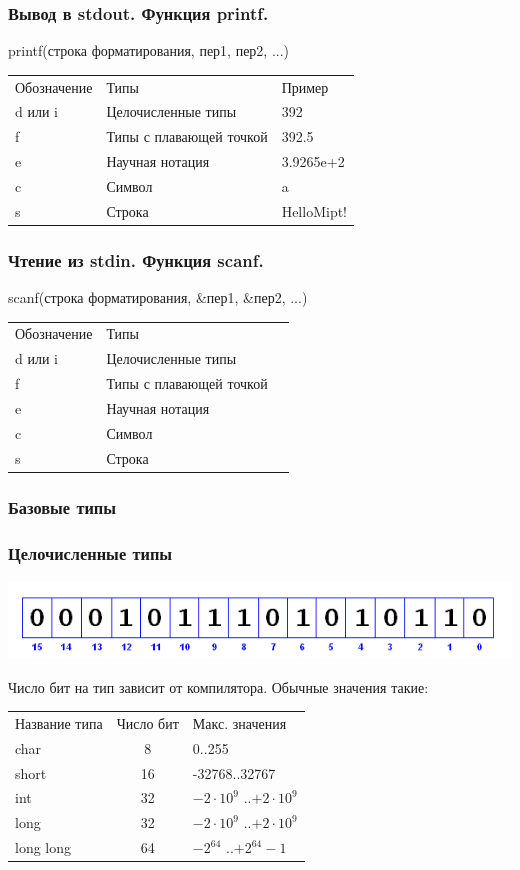 \documentclass[14pt,pdf,hyperref={unicode}]{beamer}
\begin{document}
\begin{frame}
\frametitle{Вывод в stdout. Функция printf.}
printf(строка форматирования, пер1, пер2, ...)
\begin{center}
\begin{tabular}{ l l l }
  Обозначение & Типы & Пример \\
  d или i & Целочисленные типы & 392 \\
  f & Типы с плавающей точкой & 392.5 \\
  e & Научная нотация & 3.9265e+2 \\
  c & Символ & a \\
  s & Строка & HelloMipt! \\
\end{tabular}
\end{center}

\end{frame}

\begin{frame}
\frametitle{Чтение из stdin. Функция scanf.}
scanf(строка форматирования, \&пер1, \&пер2, ...)
\begin{center}
\begin{tabular}{ l l l }
  Обозначение & Типы\\
  d или i & Целочисленные типы  \\
  f & Типы с плавающей точкой \\
  e & Научная нотация \\
  c & Символ\\
  s & Строка\\
\end{tabular}
\end{center}
\end{frame}

\begin{frame}
\frametitle{Базовые типы}
\frametitle{Целочисленные типы} 
\begin{center}
\includegraphics[scale=0.5]{bit_positions.png}
\end{center}
Число бит на тип зависит от компилятора. Обычные значения такие:
\begin{center}
\begin{tabular}{ l c l }
  Название типа & Число бит & Макс. значения \\
  char & 8 & 0..255 \\
  short & 16 & -32768..32767 \\
  int & 32 & $-2 \cdot 10^9$ ..$+2 \cdot 10^9$ \\
  long & 32& $-2 \cdot 10^9$ ..$+2 \cdot 10^9$ \\
  long long & 64 & $-2^{64}$ ..$+2^{64}-1$ \\
\end{tabular}
\end{center}
\end{frame}
\end{document}
